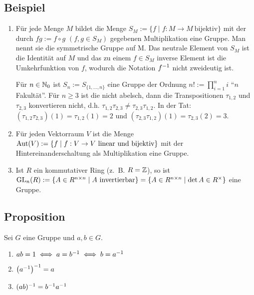 \subsection{Beispiel}
	\begin{enumerate}[label=(\alph*)]
		\item
			Für jede Menge $M$ bildet die Menge $S_M := \{f \mid f: M \to M ~ \text{bijektiv}\}$ mit der durch $fg := f \circ g$ $(f,g \in S_M)$ gegebenen Multiplikation eine Gruppe. Man nennt sie die symmetrische Gruppe auf M. Das neutrale Element von $S_M$ ist die Identität auf $M$ und das zu einem $f \in S_M$ inverse Element ist die Umkehrfunktion von $f$, wodurch die Notation $f^{-1}$ nicht zweideutig ist.
		
			Für $n \in \mathbb N_0$ ist $S_n := S_{\{1,...,n\}}$ eine Gruppe der Ordnung $n! := \prod_{i=1}^n i$ "`$n$ Fakultät"'. Für $n \geq 3$ ist die nicht abelsch, dann die Transpositionen $\tau_{1,2}$ und $\tau_{2,3}$ konvertieren nicht, d.h. $\tau_{1,2}\tau_{2,3} \neq \tau_{2,3}\tau_{1,2}$. In der Tat: $(\tau_{1,2}\tau_{2,3})(1) = \tau_{1,2}(1) = 2$ und $(\tau_{2,3}\tau_{1,2})(1) = \tau_{2,3}(2) = 3$.
		
		\item
			Für jeden Vektorraum $V$ ist die Menge $\operatorname{Aut}(V) := \{f \mid f : V \to V ~\text{linear und bijektiv}\}$ mit der Hintereinanderschaltung als Multiplikation eine Gruppe.
			
		\item
			Ist $R$ ein kommutativer Ring (z.\ B. $R = \mathbb Z$), so ist $\operatorname{GL}_n(R) := \{A \in R^{n \times n} \mid A ~\text{invertierbar}\} = \{ A \in R^{n \times n} \mid \det A \in R^\times \}$ eine Gruppe.
	\end{enumerate}
	
\subsection{Proposition} Sei $G$ eine Gruppe und $a,b \in G$.
\begin{enumerate}[label=(\alph*)]
		\item
			$ab = 1 \iff a = b^{-1} \iff b = a^{-1}$
		\item
			$\left(a^{-1}\right)^{-1} = a$
		\item
			$(ab)^{-1} = b^{-1} a^{-1}$
\end{enumerate}

